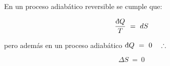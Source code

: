 
En un proceso adiabático reversible se cumple que:

\begin{equation*}
    \frac{\dbar Q}{T}\ =\ dS
\end{equation*}

pero además en un proceso adiabático $\dbar Q\ =\ 0\ \ \ \therefore$

\begin{equation*}
    \boxed{\Delta S\ =\ 0}
\end{equation*}